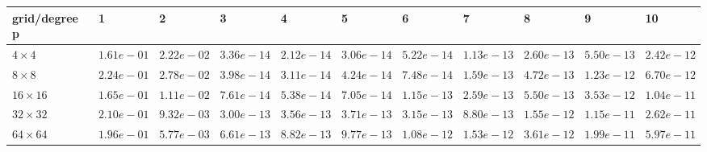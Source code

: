 \begin{tabular}{lllllllllll}
\hline
 grid/degree p   & 1          & 2          & 3          & 4          & 5          & 6          & 7          & 8          & 9          & 10         \\
\hline
 $4 \times 4$    & $1.61e-01$ & $2.22e-02$ & $3.36e-14$ & $2.12e-14$ & $3.06e-14$ & $5.22e-14$ & $1.13e-13$ & $2.60e-13$ & $5.50e-13$ & $2.42e-12$ \\
 $8 \times 8$    & $2.24e-01$ & $2.78e-02$ & $3.98e-14$ & $3.11e-14$ & $4.24e-14$ & $7.48e-14$ & $1.59e-13$ & $4.72e-13$ & $1.23e-12$ & $6.70e-12$ \\
 $16 \times 16$  & $1.65e-01$ & $1.11e-02$ & $7.61e-14$ & $5.38e-14$ & $7.05e-14$ & $1.15e-13$ & $2.59e-13$ & $5.50e-13$ & $3.53e-12$ & $1.04e-11$ \\
 $32 \times 32$  & $2.10e-01$ & $9.32e-03$ & $3.00e-13$ & $3.56e-13$ & $3.71e-13$ & $3.15e-13$ & $8.80e-13$ & $1.55e-12$ & $1.15e-11$ & $2.62e-11$ \\
 $64 \times 64$  & $1.96e-01$ & $5.77e-03$ & $6.61e-13$ & $8.82e-13$ & $9.77e-13$ & $1.08e-12$ & $1.53e-12$ & $3.61e-12$ & $1.99e-11$ & $5.97e-11$ \\
\hline
\end{tabular}